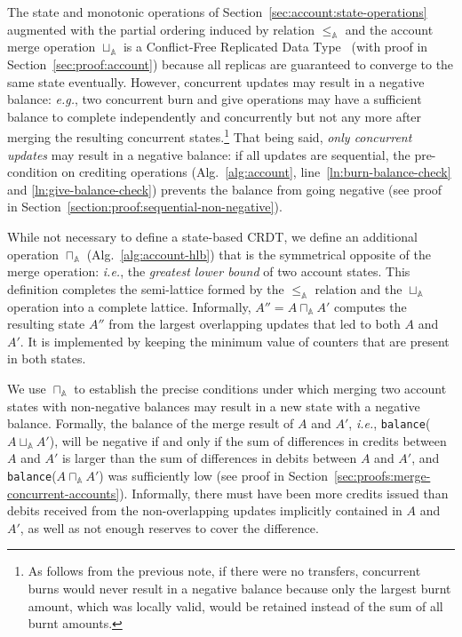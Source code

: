 \documentclass[9pt, oneside]{article}   	%
\begin{document}
The state and monotonic operations  of Section~\ref{sec:account:state-operations} augmented with the partial ordering induced by relation $\leq_\mathds{A}$ and the account merge operation $\sqcup_\mathds{A}$ is a Conflict-Free Replicated Data Type~\cite{shapiro:hal-00932836} (with proof in Section~\ref{sec:proof:account}) because all replicas are guaranteed to converge to the same state eventually. However, concurrent updates may result in a negative balance: \textit{e.g.}, two concurrent burn and give operations may have a sufficient balance to complete independently and concurrently but not any more after merging the resulting concurrent states.\footnote{As follows from the previous note, if there were no transfers, concurrent burns would never result in a negative balance because only the largest burnt amount, which was locally valid, would be retained instead of the sum of all burnt amounts.} That being said, \textit{only concurrent updates} may result in a negative balance: if all updates are sequential, the pre-condition on crediting operations (Alg.~\ref{alg:account}, line~\ref{ln:burn-balance-check} and \ref{ln:give-balance-check}) prevents the balance from going negative (see proof in Section~\ref{section:proof:sequential-non-negative}).

While not necessary to define a state-based CRDT, we define an additional operation $\sqcap_\mathds{A}$ (Alg.~\ref{alg:account-hlb}) that is the symmetrical opposite of the merge operation: \textit{i.e.}, the \textit{greatest lower bound} of two account states. This definition completes the semi-lattice formed by the $\leq_\mathds{A}$ relation and the $\sqcup_\mathds{A}$ operation into a complete lattice. Informally, $A'' = A \sqcap_\mathds{A} A'$ computes the resulting state $A''$ from the largest overlapping updates that led to both $A$ and $A'$. It is implemented by keeping the minimum value of counters that are present in both states.

We use $\sqcap_\mathds{A}$ to establish the precise conditions under which merging two account states with non-negative balances may result in a new state with a negative balance. Formally, the balance of the merge result of $A$ and $A'$, \textit{i.e.}, \texttt{balance}($A \sqcup_\mathds{A} A'$), will be negative if and only if the sum of differences in credits between $A$ and $A'$ is larger than the sum of differences in debits between $A$ and $A'$, and \texttt{balance}($A \sqcap_\mathds{A} A'$) was sufficiently low (see proof in Section~\ref{sec:proofs:merge-concurrent-accounts}). Informally, there must have been more credits issued than debits received from the non-overlapping updates implicitly contained in $A$ and $A'$, as well as not enough reserves to cover the difference.
\end{document}
